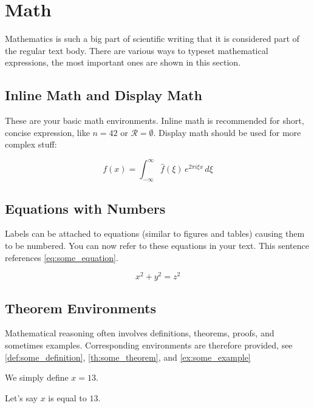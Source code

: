 \section{Math}

Mathematics is such a big part of scientific writing that it is considered part of the regular text body.
There are various ways to typeset mathematical expressions, the most important ones are shown in this section.

\subsection{Inline Math and Display Math}

These are your basic math environments.
Inline math is recommended for short, concise expression, like $n = 42$ or $\mathcal{R} = \emptyset$.
Display math should be used for more complex stuff:

$$f(x) = \int_{-\infty}^\infty \hat f(\xi)\,e^{2 \pi i \xi x} \,d\xi$$

\subsection{Equations with Numbers}

Labels can be attached to equations (similar to figures and tables) causing them to be numbered.
You can now refer to these equations in your text.
This sentence references \cref{eq:some_equation}.

\begin{equation}
	x^2 + y^2 = z^2
	\label{eq:some_equation}
\end{equation}

\subsection{Theorem Environments}

Mathematical reasoning often involves definitions, theorems, proofs, and sometimes examples.
Corresponding environments are therefore provided, see \cref{def:some_definition}, \cref{th:some_theorem}, and \cref{ex:some_example}

\begin{definition}
	We simply define $x = 13$.
	\label{def:some_definition}
\end{definition}

\begin{theorem}
	Let's say $x$ is equal to $13$.
	\label{th:some_theorem}
\end{theorem}

